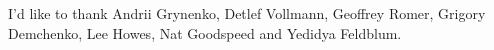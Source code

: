 
I'd like to thank Andrii Grynenko, Detlef Vollmann, Geoffrey Romer,
Grigory Demchenko, Lee Howes, Nat Goodspeed and Yedidya Feldblum.
